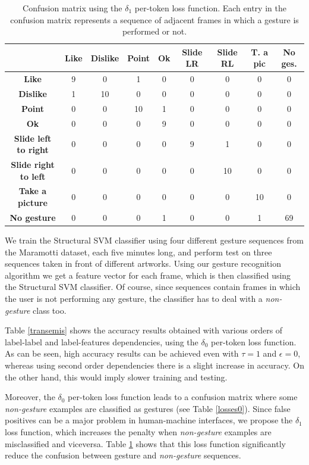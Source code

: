 \begin{table}
\begin{center}
\begin{tabular}{|c|c|c|c|c|c|c|c|c|}
\hline
 	& \textbf{Like}	& \textbf{Dislike}	&\textbf{Point}	&\textbf{Ok}	&\textbf{Slide LR}	&\textbf{Slide RL}	&\textbf{T. a pic}	& \textbf{No ges.} \\
\hline
\hline
 \textbf{Like}  & 9 & 0 & 1 & 0 & 0 & 0 & 0 & 0 \\
\textbf{Dislike}  & 1 & 10 & 0 & 0 & 0 & 0 & 0 & 0 \\
\textbf{Point}  & 0 & 0 & 10 & 1 & 0 & 0 & 0 & 0 \\
\textbf{Ok}  & 0 & 0 & 0 & 9 & 0 & 0 & 0 & 0 \\
\textbf{Slide left to right}  & 0 & 0 & 0 & 0 & 9 & 1 & 0 & 0 \\
\textbf{Slide right to left} & 0 & 0 & 0 & 0 & 0 & 10 & 0 & 0 \\
\textbf{Take a picture} & 0 & 0 & 0 & 0 & 0 & 0 & 10 & 0 \\
\textbf{No gesture}  & 0 & 0 & 0 & 1 & 0 & 0 & 1 & 69 \\
\hline
\end{tabular}
\end{center}
\caption{Confusion matrix using the $\delta_1$ per-token loss function.  Each entry in the confusion matrix represents a sequence of adjacent frames in which a gesture is performed or not.}
\label{losses1}
\end{table}

We train the Structural SVM classifier using four different gesture sequences from the Maramotti dataset, each five minutes long, and perform test on three sequences taken in front of different artworks. Using our gesture recognition algorithm we get a feature vector for each frame, which is then classified using the Structural SVM classifier. Of course, since sequences contain frames in which the user is not performing any gesture, the classifier has to deal with a \textit{non-gesture} class too.

Table \ref{transemis} shows the accuracy results obtained with various orders of label-label and label-features dependencies, using the $\delta_0$ per-token loss function. As can be seen, high accuracy results can be achieved even with $\tau = 1$ and $\epsilon = 0$, whereas using second order dependencies there is a slight increase in accuracy. On the other hand, this would imply slower training and testing.

Moreover, the $\delta_0$ per-token loss function leads to a confusion matrix where some \textit{non-gesture} examples are classified as gestures (see Table \ref{losses0}). Since false positives can be a major problem in human-machine interfaces, we propose the $\delta_1$ loss function, which increases the penalty when \textit{non-gesture} examples are misclassified and viceversa. Table \ref{losses1} shows that this loss function significantly reduce the confusion between gesture and \textit{non-gesture} sequences.


